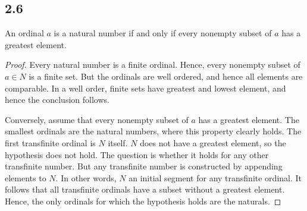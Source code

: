 \subsection*{2.6} An ordinal $a$ is a natural number if and only if every nonempty subset of $a$ has a greatest element.

\begin{proof}
    Every natural number is a finite ordinal. Hence, every nonempty subset of $a \in N$ is a finite set. But the ordinals are well ordered, and hence all elements are comparable. In a well order, finite sets have greatest and lowest element, and hence the conclusion follows.

    Conversely, assume that every nonempty subset of $a$ has a greatest element. The smallest ordinals are the natural numbers, where this property clearly holds. The first transfinite ordinal is $N$ itself. $N$ does not have a greatest element, so the hypothesis does not hold. The question is whether it holds for any other transfinite number. But any transfinite number is constructed by appending elements to $N$. In other words, $N$ an initial segment for any transfinite ordinal. It follows that all transfinite ordinals have a subset without a greatest element. Hence, the only ordinals for which the hypothesis holds are the naturals.
\end{proof}

